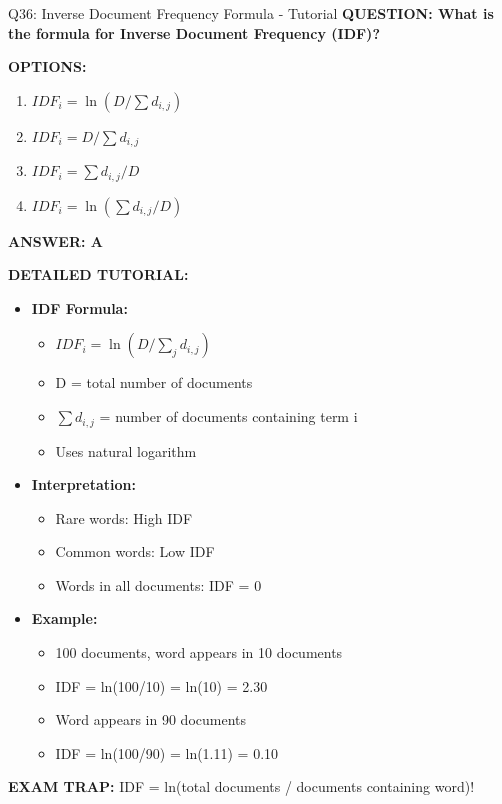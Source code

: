 \documentclass[8pt]{beamer}
\begin{document}
	\begin{frame}{Q36: Inverse Document Frequency Formula - Tutorial}
		\fontsize{6.5}{7.5}\selectfont
		\textbf{QUESTION: What is the formula for Inverse Document Frequency (IDF)?}
		
		\vspace{0.1cm}
		\textbf{OPTIONS:}
		\begin{enumerate}
			\item $IDF_i = \ln(D / \sum d_{i,j})$
			\item $IDF_i = D / \sum d_{i,j}$
			\item $IDF_i = \sum d_{i,j} / D$
			\item $IDF_i = \ln(\sum d_{i,j} / D)$
		\end{enumerate}
		
		\vspace{0.1cm}
		\textcolor{myblue}{\textbf{ANSWER: A}}
		
		\vspace{0.1cm}
		\textbf{DETAILED TUTORIAL:}
		\begin{itemize}
			\item \textbf{IDF Formula:}
			\begin{itemize}
				\item $IDF_i = \ln(D / \sum_{j} d_{i,j})$
				\item D = total number of documents
				\item $\sum d_{i,j}$ = number of documents containing term i
				\item Uses natural logarithm
			\end{itemize}
			\item \textbf{Interpretation:}
			\begin{itemize}
				\item Rare words: High IDF
				\item Common words: Low IDF
				\item Words in all documents: IDF = 0
			\end{itemize}
			\item \textbf{Example:}
			\begin{itemize}
				\item 100 documents, word appears in 10 documents
				\item IDF = ln(100/10) = ln(10) = 2.30
				\item Word appears in 90 documents
				\item IDF = ln(100/90) = ln(1.11) = 0.10
			\end{itemize}
		\end{itemize}
		
		\textcolor{myred}{\textbf{EXAM TRAP:}} IDF = \textcolor{myblue}{ln(total documents / documents containing word)}!
	\end{frame}
	
\end{document}
